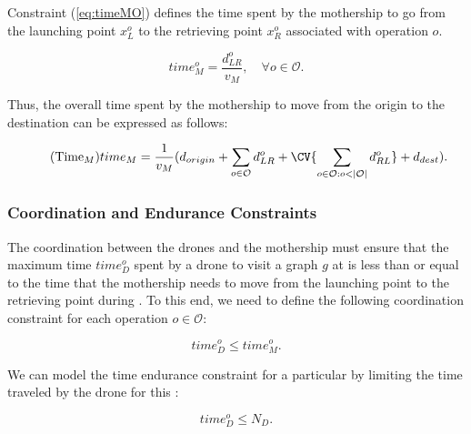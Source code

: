 {\noindent
Constraint (\ref{eq:timeMO}) defines the time spent by the mothership to go from the launching point $x_L^o$ to the retrieving point $x_R^o$ associated with operation $o$.

\begin{equation}\tag{Time$_M^o$}
time_M^o = \frac{d_{LR}^o}{v_M}, \quad \forall o \in \mathcal O.
\label{eq:timeMO}
\end{equation}

\noindent
Thus, the overall time spent by the mothership to move from the origin to the destination can be expressed as follows:

\begin{equation}\tag{Time$_M$}
time_M = \frac{1}{v_M} (d_{origin} + \sum_{o \in \mathcal O} d_{LR}^o + \CV{\sum_{o \in \mathcal O:o<|\mathcal O|} d_{RL}^o} + d_{dest}).
\label{eq:timeM}
\end{equation}



\subsubsection*{Coordination and Endurance Constraints}
\noindent
The coordination between the drones and the mothership must ensure that the maximum time $time_D^o$ spent by a drone to visit a graph $g$ at  is less than or equal to the time that the mothership needs to move from the launching point to the retrieving point during . To this end, we need to define the following coordination constraint for each operation $o\in \mathcal O$:

\begin{equation}\tag{DCW-CO}\label{DCW}
time_D^o \leq time_M^o.
\end{equation}



\noindent
We can model the time endurance constraint for a particular  by limiting the time traveled by the drone for this :

\begin{equation}\tag{Endurance-CO}\label{CAP}
    time_D^o \leq N_D.
\end{equation}


}
